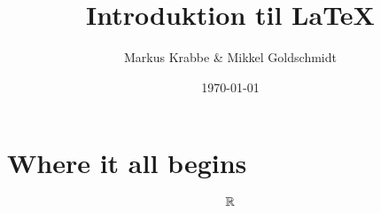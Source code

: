 \documentclass[titlepage]{article}
\title{Introduktion til \LaTeX{} }
\author{Markus Krabbe & Mikkel Goldschmidt}
\date{\today}
\begin{document}
\part*{Where it all begins}

$$\mathbb{R}$$
\end{document}
